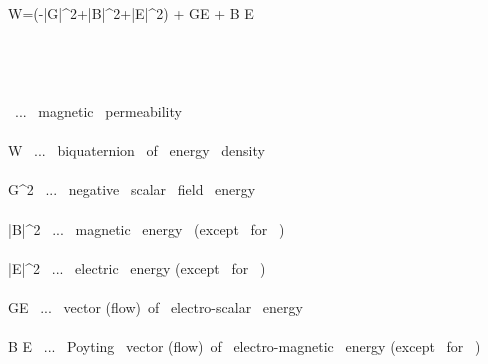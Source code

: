 \mu  \widehat W=(-|G|^2+|\vec B|^2+|\vec E|^2) +\imath {} G\vec E +\imath {} \vec B \times \vec E \\\\\\

\\\\

\mu \ ... \ magnetic \ permeability \\\\
\widehat W \ ... \ biquaternion \ of \ energy \ density \\\\
G^2 \ ... \  negative \ scalar \ field \ energy \\\\
|\vec B|^2 \ ... \ magnetic \ energy \ (except \ for \ \mu) \\\\
|\vec E|^2 \ ... \ electric \ energy (except \ for \ \mu) \\\\
 G\vec E \ ... \ vector (flow)\ of \ electro-scalar \ energy \\\\
 \vec B \times \vec E \ ... \ Poyting \ vector (flow)\ of \ electro-magnetic \ energy (except \ for \ \mu)
